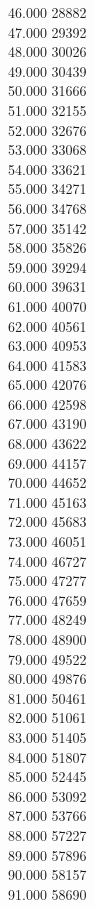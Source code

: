 { 46.000	28882 \\
 47.000	29392 \\
 48.000	30026 \\
 49.000	30439 \\
 50.000	31666 \\
 51.000	32155 \\
 52.000	32676 \\
 53.000	33068 \\
 54.000	33621 \\
 55.000	34271 \\
 56.000	34768 \\
 57.000	35142 \\
 58.000	35826 \\
 59.000	39294 \\
 60.000	39631 \\
 61.000	40070 \\
 62.000	40561 \\
 63.000	40953 \\
 64.000	41583 \\
 65.000	42076 \\
 66.000	42598 \\
 67.000	43190 \\
 68.000	43622 \\
 69.000	44157 \\
 70.000	44652 \\
 71.000	45163 \\
 72.000	45683 \\
 73.000	46051 \\
 74.000	46727 \\
 75.000	47277 \\
 76.000	47659 \\
 77.000	48249 \\
 78.000	48900 \\
 79.000	49522 \\
 80.000	49876 \\
 81.000	50461 \\
 82.000	51061 \\
 83.000	51405 \\
 84.000	51807 \\
 85.000	52445 \\
 86.000	53092 \\
 87.000	53766 \\
 88.000	57227 \\
 89.000	57896 \\
 90.000	58157 \\
 91.000	58690 \\
}
